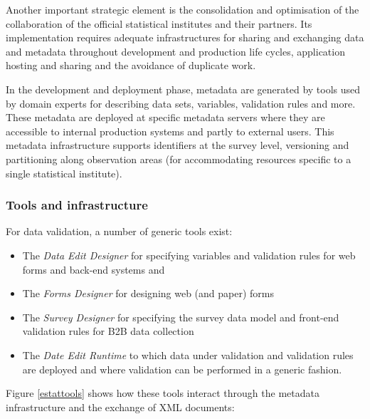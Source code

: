 Another important strategic element is the consolidation and optimisation of the collaboration of the official statistical institutes and their partners. Its implementation requires adequate infrastructures for sharing and exchanging data and metadata throughout development and production life cycles, application hosting and sharing and the avoidance of duplicate work.

In the development and deployment phase, metadata are generated by tools used by domain experts for describing data sets, variables, validation rules and more. These metadata are deployed at specific metadata servers where they are accessible to internal production systems and partly to external users. This metadata infrastructure supports identifiers at the survey level, versioning and partitioning along observation areas (for accommodating resources specific to a single statistical institute). 

\subsubsection{Tools and infrastructure}
For data validation, a number of generic tools exist:

\begin{itemize}

\item
The \textit{Data Edit Designer} for specifying variables and validation rules for web forms and back-end systems and 

\item
The \textit{Forms Designer} for designing web (and paper) forms 

\item
The \textit{Survey Designer} for specifying the survey
data model and front-end validation rules for B2B data collection

\item
The \textit{Date Edit Runtime} to which data under validation and validation rules are deployed and where validation can be performed in a generic fashion.

\end{itemize}

Figure \ref{estattools} shows how these tools interact through the metadata infrastructure and the exchange of XML documents:

